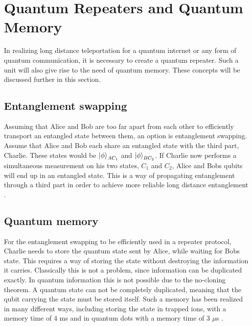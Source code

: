 \section{Quantum Repeaters and Quantum Memory}
In realizing long distance teleportation for a quantum internet or any form of quantum communication, it is necessary to create a quantum repeater. Such a unit will also give rise to the need of quantum memory. These concepts will be discussed further in this section.

\subsection{Entanglement swapping}

Assuming that Alice and Bob are too far apart from each other to efficiently transport an entangled state between them,
an option is entanglement swapping. Assume that Alice and Bob each share an entangled state with the third part, Charlie.
These states would be $\ket{\phi}_{AC_1}$ and $\ket{\phi}_{BC_2}$. If Charlie now performs a simultaneous measurement on his two states, $C_1$ and $C_2$,
Alice and Bobs qubits will end up in an entangled state. This is a way of propagating entanglement through a third part in order to achieve more reliable long distance entanglement \cite{Azuma:2023}.

\subsection{Quantum memory}

For the entanglement swapping to be efficiently used in a repeater protocol, 
Charlie needs to store the quantum state sent by Alice, while waiting for Bobs state. This requires a way of storing the state without destroying the information it carries.
Classically this is not a problem, since information can be duplicated exactly. In quantum information this is not possible due to the no-cloning theorem.
A quantum state can not be completely duplicated, meaning that the qubit carrying the state must be stored itself.
Such a memory has been realized in many different ways, including storing the state in trapped ions, with a memory time of 4 ms \cite{trapped_ion_memory} and in quantum dots with a memory time of 3 $\mu$s \cite{dot_memory}.


